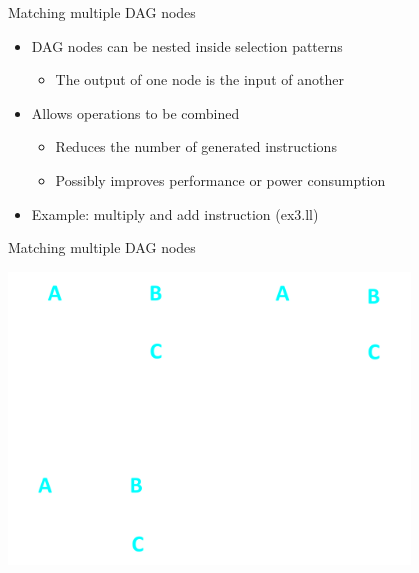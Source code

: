 \begin{frame}[fragile]{Matching multiple DAG nodes}

\begin{itemize}
    \item DAG nodes can be nested inside selection patterns
    \begin{itemize}
        \item The output of one node is the input of another
    \end{itemize}
    \item Allows operations to be combined
    \begin{itemize}
        \item Reduces the number of generated instructions
        \item Possibly improves performance or power consumption
    \end{itemize}
    \item Example: multiply and add instruction (ex3.ll)
\end{itemize}


\end{frame}


\begin{frame}[fragile]{Matching multiple DAG nodes}

\includegraphics[width = 0.80\textwidth]{examples/ex3-selection1.png}

\end{frame}

